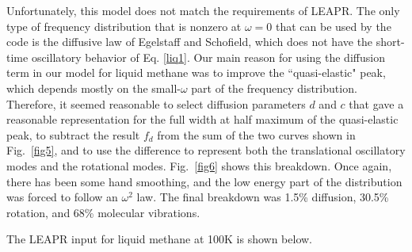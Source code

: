 Unfortunately, this model does not match the requirements of LEAPR.  The
only type of frequency distribution that is nonzero at $\omega{=}0$ that
can be used by the code is the diffusive law of Egelstaff and Schofield,
which does not have the short-time oscillatory behavior of Eq. \ref{liq1}.
Our main reason for using the diffusion term in our model for liquid methane
was to improve the ``quasi-elastic" peak, which depends mostly on the
small-$\omega$ part of the frequency distribution.  Therefore, it seemed
reasonable to select diffusion parameters $d$ and $c$ that gave a reasonable
representation for the full width at half maximum of the quasi-elastic
peak, to subtract the result $f_d$ from the sum of the two curves shown
in Fig.~\ref{fig5}, and to use the difference to represent both the
translational oscillatory modes and the rotational modes.  Fig.~\ref{fig6}
shows this breakdown. Once again, there has been some hand smoothing, and
the low energy part of the distribution was forced to follow an $\omega^2$
law.  The final breakdown was 1.5\% diffusion, 30.5\% rotation, and 68\%
molecular vibrations.

The LEAPR input for liquid methane at 100K is shown below.

